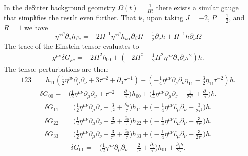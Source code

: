 \documentclass[10pt,letterpaper]{article}
\begin{document}
In the deSitter background geometry $\Omega(t) = \frac{1}{Ht}$ there exists a similar gauge that simplifies the result even further. That is, upon taking $J = -2$, $P = \tfrac12$, and $R = 1$ we have
\begin{equation}
	\eta^{\alpha\beta}\partial_{\alpha}h_{\beta\nu} = -2 \Omega^{-1}  \eta^{\alpha\beta}h_{\nu\alpha}\partial_\beta \Omega + \tfrac{1}{2} \partial_\nu h +  \Omega^{-1} h \partial_\nu \Omega
\end{equation}
The trace of the Einstein tensor evaluates to 
\begin{align}
g^{\mu\nu}\delta G_{\mu\nu} ={}&2 H^2 h_{00}
 + (-2 H^2
 -  \tfrac{1}{2} H^2 \eta^{\mu \nu} \partial_{\mu} \partial_{\nu} \tau^2) h.
\end{align}
The tensor perturbations are then:
\begin{align}
123={}&h_{11} (\tfrac{1}{2} \eta^{\mu \nu} \partial_{\mu} \partial_{\nu}
 + 3 \tau^{-2}
 + \partial_{0} \tau^{-1})
 + (- \tfrac{1}{4} \eta^{\mu \nu} \partial_{\mu} \partial_{\nu} \eta_{11}
 -  \tfrac{3}{2} \eta_{11} \tau^{-2}) h.
\end{align}
\begin{align}
\delta G_{00}={}& \bigg(\tfrac{1}{2} \eta^{\mu \nu} \partial_{\mu} \partial_{\nu}
 + \tau^{-2}
 + \frac{\partial_{0}}{\tau}\bigg)h_{00}
 + \bigg(\tfrac{1}{4} \eta^{\mu \nu} \partial_{\mu} \partial_{\nu}
 + \frac{1}{2 \tau^2}
 + \frac{\partial_{0}}{\tau}\bigg) h.
\end{align}
\begin{align}
\delta G_{11}={}& \bigg(\tfrac{1}{2} \eta^{\mu \nu} \partial_{\mu} \partial_{\nu}
 + \frac{3}{\tau^2}
 + \frac{\partial_{0}}{\tau}\bigg)h_{11}
 + \bigg(- \tfrac{1}{4} \eta^{\mu \nu} \partial_{\mu} \partial_{\nu}
 -  \frac{3}{2 \tau^2}\bigg) h.
\end{align}
\begin{align}
\delta G_{22}={}&\bigg(\tfrac{1}{2} \eta^{\mu \nu} \partial_{\mu} \partial_{\nu}
 + \frac{3}{\tau^2}
 + \frac{\partial_{0}}{\tau}\bigg)h_{22} 
 + \bigg(- \tfrac{1}{4} \eta^{\mu \nu} \partial_{\mu} \partial_{\nu}
 -  \frac{3}{2 \tau^2}\bigg) h.
\end{align}
\begin{align}
\delta G_{33}={}&\bigg(\tfrac{1}{2} \eta^{\mu \nu} \partial_{\mu} \partial_{\nu}
 + \frac{3}{\tau^2}
 + \frac{\partial_{0}}{\tau}\bigg)h_{33} 
 + \bigg(- \tfrac{1}{4} \eta^{\mu \nu} \partial_{\mu} \partial_{\nu}
 -  \frac{3}{2 \tau^2}\bigg) h.
\end{align}
\begin{align}
\delta G_{01}={}& \bigg(\tfrac{1}{2} \eta^{\mu \nu} \partial_{\mu} \partial_{\nu}
 + \frac{2}{\tau^2}
 + \frac{\partial_{0}}{\tau}\bigg)h_{01}
 + \frac{\partial_{1} h}{2 \tau}.
\end{align}
\end{document}
